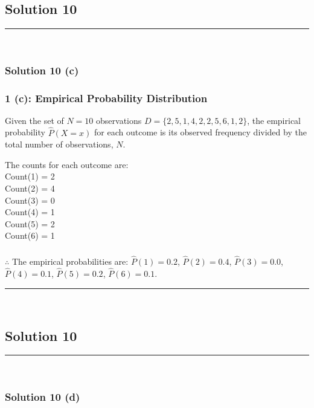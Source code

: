 \documentclass{article}
\begin{document}
\newpage

\subsection*{Solution 10}
\noindent\rule{\textwidth}{0.4pt}\\
\subsubsection*{Solution  10 (c)}

\subsubsection*{1 (c): Empirical Probability Distribution}
\parbox{\textwidth}{Given the set of $N=10$ observations $D = \{2, 5, 1, 4, 2, 2, 5, 6, 1, 2\}$, the empirical probability $\hat{P}(X=x)$ for each outcome is its observed frequency divided by the total number of observations, $N$.}
\parbox{\textwidth}{The counts for each outcome are: \\ Count(1) = 2 \\ Count(2) = 4 \\ Count(3) = 0 \\ Count(4) = 1 \\ Count(5) = 2 \\ Count(6) = 1}
\subsubsection*{\normalfont}{$\therefore$ The empirical probabilities are: $\hat{P}(1)=0.2$, $\hat{P}(2)=0.4$, $\hat{P}(3)=0.0$, $\hat{P}(4)=0.1$, $\hat{P}(5)=0.2$, $\hat{P}(6)=0.1$.}


\noindent\rule{\textwidth}{0.4pt}\\

\newpage

\subsection*{Solution 10}
\noindent\rule{\textwidth}{0.4pt}\\
\subsubsection*{Solution  10 (d)}
\end{document}
